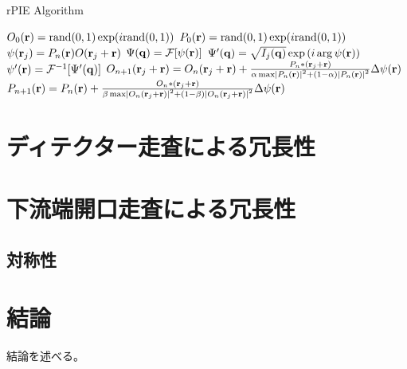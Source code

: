 \begin{algorithm}                      
\caption{rPIE Algorithm}         
\label{alg:rpie}                          
\begin{algorithmic}
    \STATE $O_0(\mathbf{r}) = \mathrm{rand}(0,1) \exp(i \mathrm{rand}(0,1) )$
    \STATE $P_0(\mathbf{r}) = \mathrm{rand}(0,1) \exp(i \mathrm{rand}(0,1) )$
        \STATE $\psi(\mathbf{r}_j) = P_n(\mathbf{r}) O(\mathbf{r}_j + \mathbf{r})$
        \STATE $\Psi(\mathbf{q}) = \mathcal F [\psi(\mathbf{r})]$
        \STATE $\Psi'(\mathbf{q}) = \sqrt{I_j(\mathbf{q})} \exp\left( i \arg \psi(\mathbf{r}) \right)$ 
        \STATE $\psi'(\mathbf{r}) = \mathcal F^{-1} [\Psi'(\mathbf{q})]$
        \STATE $O_{n+1}(\mathbf{r}_j + \mathbf{r}) 
          = O_n(\mathbf{r}_j + \mathbf{r}) + \frac{P_n*(\mathbf{r}_j + \mathbf{r})}
          {\alpha \max \left| P_n(\mathbf{r}) \right|^2 + (1-\alpha) \left| P_n(\mathbf{r}) \right|^2}
          \Delta\psi(\mathbf{r})$
        \STATE $P_{n+1}(\mathbf{r})
          = P_n(\mathbf{r}) + \frac{O_n*(\mathbf{r}_j + \mathbf{r})}
          {\beta \max \left| O_n(\mathbf{r}_j + \mathbf{r}) \right|^2 + (1-\beta) \left| O_n(\mathbf{r}_j + \mathbf{r}) \right|^2}
          \Delta\psi(\mathbf{r})$
      \ENDFOR
    \ENDFOR
\end{algorithmic}
\end{algorithm}

\clearpage
\newpage

\section{ディテクター走査による冗長性}


\clearpage
\newpage

\section{下流端開口走査による冗長性}

\subsection{対称性}

\clearpage
\newpage


\section{結論}
\label{chap3_conclusion}
結論を述べる。




